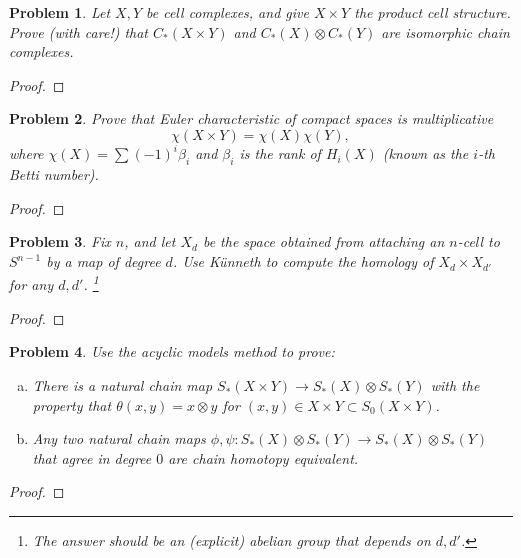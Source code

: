\documentclass[11pt]{article}
\newtheorem{problem}{Problem}
\begin{document}
\pagebreak 


\begin{problem}
Let $X,Y$ be cell complexes, and give $X\times Y$ the product cell structure. Prove (with care!) that $C_*(X\times Y)$ and $C_*(X)\otimes C_*(Y)$ are isomorphic chain complexes. 
\end{problem}

\begin{proof}

\end{proof}

\pagebreak 

\begin{problem}
Prove that Euler characteristic of compact spaces is multiplicative 
\[\chi(X\times Y)=\chi(X)\chi(Y),\] where $\chi(X)=\sum(-1)^i\beta_i$ and $\beta_i$ is the rank of $H_i(X)$ (known as the $i$-th Betti number).
\end{problem}

\begin{proof}

\end{proof}

\pagebreak 


\begin{problem}
Fix $n$, and let $X_d$ be the space obtained from attaching an $n$-cell to $S^{n-1}$ by a map of degree $d$. Use K\"unneth to compute the homology of $X_d\times X_{d'}$ for any $d,d'$. \footnote{The answer should be an (explicit) abelian group that depends on $d,d'$.} 
\end{problem}

\begin{proof}

\end{proof}

\pagebreak 

\begin{problem}
Use the acyclic models method to prove: 
\begin{enumerate}[(a)]
\item There is a natural chain map $S_*(X\times Y)\to S_*(X)\otimes S_*(Y)$ with the property that $\theta(x,y)=x\otimes y$ for $(x,y)\in X\times Y\subset S_0(X\times Y)$. 
\item Any two natural chain maps $\phi,\psi:S_*(X)\otimes S_*(Y)\to S_*(X)\otimes S_*(Y)$ that agree in degree $0$ are chain homotopy equivalent. 
\end{enumerate} 
\end{problem}

\begin{proof}

\end{proof}
\end{document}
